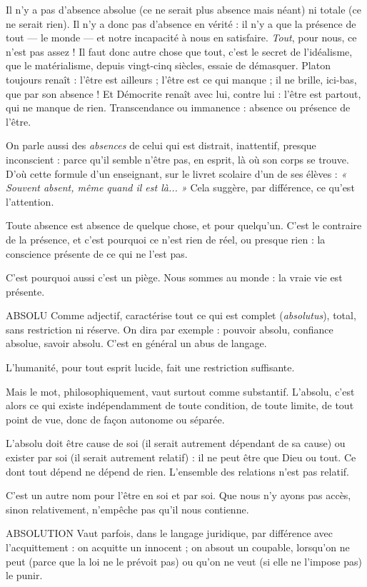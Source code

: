 Il n’y a pas d’absence absolue (ce ne serait plus absence mais néant) ni totale
(ce ne serait rien). Il n’y a donc pas d’absence en vérité : il n’y a que la présence
de tout — le monde — et notre incapacité à nous en satisfaire. {\it Tout}, pour nous, ce
n'est pas assez ! Il faut donc autre chose que tout, c’est le secret de l’idéalisme, que
le matérialisme, depuis vingt-cinq siècles, essaie de démasquer. Platon toujours
renaît : l'être est ailleurs ; l'être est ce qui manque ; il ne brille, ici-bas, que par son
absence ! Et Démocrite renaît avec lui, contre lui : l’être est partout, qui ne
manque de rien. Transcendance ou immanence : absence ou présence de l'être.

On parle aussi des {\it absences} de celui qui est distrait, inattentif, presque
inconscient : parce qu’il semble n’être pas, en esprit, là où son corps se trouve.
D'où cette formule d’un enseignant, sur le livret scolaire d’un de ses élèves :
{\it « Souvent absent, même quand il est là... »} Cela suggère, par différence, ce qu’est
l'attention.

Toute absence est absence de quelque chose, et pour quelqu’un. C’est le
contraire de la présence, et c’est pourquoi ce n’est rien de réel, ou presque rien :
la conscience présente de ce qui ne l’est pas.

C’est pourquoi aussi c’est un piège. Nous sommes au monde : la vraie vie
est présente.

ABSOLU Comme adjectif, caractérise tout ce qui est complet ({\it absolutus}),
total, sans restriction ni réserve. On dira par exemple : pouvoir
absolu, confiance absolue, savoir absolu. C’est en général un abus de langage.

L'humanité, pour tout esprit lucide, fait une restriction suffisante.

Mais le mot, philosophiquement, vaut surtout comme substantif. L’absolu,
c'est alors ce qui existe indépendamment de toute condition, de toute limite,
de tout point de vue, donc de façon autonome ou séparée.

L’absolu doit être cause de soi (il serait autrement dépendant de sa cause) ou
exister par soi (il serait autrement relatif) : il ne peut être que Dieu ou tout. Ce
dont tout dépend ne dépend de rien. L'ensemble des relations n’est pas relatif.

C’est un autre nom pour l'être en soi et par soi. Que nous n’y ayons pas
accès, sinon relativement, n’empêche pas qu’il nous contienne.

ABSOLUTION  Vaut parfois, dans le langage juridique, par différence avec
l’acquittement : on acquitte un innocent ; on absout un
coupable, lorsqu'on ne peut (parce que la loi ne le prévoit pas) ou qu'on ne
veut (si elle ne l’impose pas) le punir.

